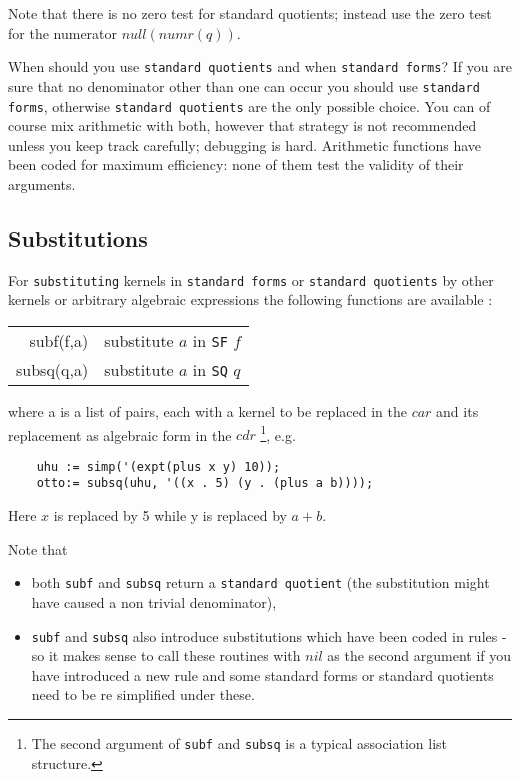Note that there is no zero test for standard quotients; instead
use the zero test for the numerator $null(numr(q))$.

When should you use {\tt standard quotients} and when {\tt standard forms}?
If you are sure that no denominator other
than one can occur you should use {\tt standard forms}, otherwise
{\tt standard quotients} are the only possible choice. You can of course
mix arithmetic with both, however that strategy is 
not recommended unless you keep track carefully;  
debugging is hard. Arithmetic functions have been coded
for maximum efficiency: none of them test the validity of their
arguments.

\subsection{Substitutions}

For {\tt substituting} kernels in {\tt standard forms} 
or  {\tt standard quotients} 
by other kernels or arbitrary algebraic expressions the
following functions are available :
\begin{center}
\begin{tabular}{|r|l|} \hline 
    subf(f,a)& substitute $a$ in {\tt SF} $f$ \\
    subsq(q,a)& substitute $a$ in {\tt SQ} $q$ \\
\hline
\end{tabular}
\end{center}
where a is a list of pairs, each with a kernel to be replaced 
in the $car$ and its replacement as algebraic form in the $cdr$
\footnote{The second argument of {\tt subf} and {\tt subsq} 
is a typical association list structure.},
e.g.
\begin{verbatim}
    uhu := simp('(expt(plus x y) 10));
    otto:= subsq(uhu, '((x . 5) (y . (plus a b))));
\end{verbatim}
Here $x$ is replaced by 5 while y is replaced by $a+b$.

Note that
\begin{itemize}
\item both {\tt subf} and {\tt subsq} return a {\tt standard quotient}
(the substitution might have caused a non trivial denominator),
\item {\tt subf} and {\tt subsq} also introduce substitutions which have been
coded in rules - so it makes sense to call these routines with
$nil$ as the second argument if you have introduced a new rule and
some standard forms or standard quotients need to be re simplified
under these.
\end{itemize}

